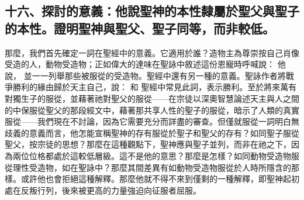 
\subsection{十六、探討的意義：他說聖神的本性隸屬於聖父與聖子的本性。證明聖神與聖父、聖子同等，而非較低。}

那麼，我們首先確定一詞在聖經中的意義。它適用於誰？造物主為尊崇按自己肖像受造的人，動物受造物；正如偉大的達味在聖詠中敘述這份恩寵時呼喊說： 他說， 並一一列舉那些被服從的受造物。聖經中還有另一種的意義。聖詠作者將戰爭勝利的緣由歸於天主自己，說： 和 聖經中常見此詞，表示勝利。至於將來萬有對獨生子的服從，並藉著祂對聖父的服從——在宗徒以深奧智慧論述天主與人之間的中保服從聖父的那段經文中，藉著那共享人性的聖子的服從，暗示了人類的真實服從——我們現在不討論，因為它需要充分而詳盡的審查。但僅就服從一詞明白無歧義的意義而言，他怎能宣稱聖神的存有服從於聖子和聖父的存有？如同聖子服從聖父，按宗徒的思想？那麼在這種觀點下，聖神應與聖子並列，而非在祂之下，因為兩位位格都處於這較低層級。這不是他的意思？那麼是怎樣？如同動物受造物服從理性受造物，如在聖詠中？那麼其間差異有如動物受造物服從於人時所隱含的那樣。或許他也會拒絕這種解釋。那麼他就不得不來到僅剩的一種解釋，即聖神起初處在反叛行列，後來被更高的力量強迫向征服者屈服。\par

